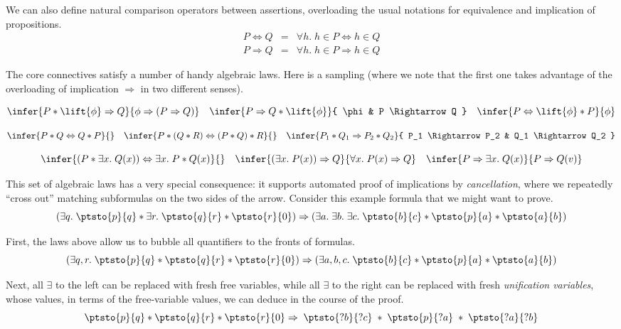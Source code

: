 \documentclass{amsbook}
\theoremstyle{definition}
\theoremstyle{remark}
\numberwithin{section}{chapter}
\numberwithin{equation}{chapter}
\begin{document}
We can also define natural comparison operators between assertions, overloading the usual notations for equivalence and implication of propositions.
\begin{eqnarray*}
  P \Leftrightarrow Q &=& \forall h. \; h \in P \Leftrightarrow h \in Q \\
  P \Rightarrow Q &=& \forall h. \; h \in P \Rightarrow h \in Q
\end{eqnarray*}

The core connectives satisfy a number of handy algebraic laws.
Here is a sampling (where we note that the first one takes advantage of the overloading of implication $\Rightarrow$ in two different senses).

$$\infer{P * \lift{\phi} \Rightarrow Q}{
  \phi \Rightarrow (P \Rightarrow Q)
}
\quad \infer{P \Rightarrow Q * \lift{\phi}}{
  \phi
  & P \Rightarrow Q
}
\quad \infer{P \Leftrightarrow \lift{\phi} * P}{
  \phi
}$$

$$\infer{P * Q \Leftrightarrow Q * P}{}
\quad \infer{P * (Q * R) \Leftrightarrow (P * Q) * R}{}
\quad \infer{P_1 * Q_1 \Rightarrow P_2 * Q_2}{
  P_1 \Rightarrow P_2
  & Q_1 \Rightarrow Q_2
}$$

$$\infer{(P * \exists x. \; Q(x)) \Leftrightarrow \exists x. \; P * Q(x)}{}
\quad \infer{(\exists x. \; P(x)) \Rightarrow Q}{
  \forall x. \; P(x) \Rightarrow Q
}
\quad \infer{P \Rightarrow \exists x. \; Q(x)}{
  P \Rightarrow Q(v)
}$$

This set of algebraic laws has a very special consequence: it supports automated proof of implications by \emph{cancellation}, where we repeatedly ``cross out'' matching subformulas on the two sides of the arrow.
Consider this example formula that we might want to prove.
$$(\exists q. \; \ptsto{p}{q} * \exists r. \; \ptsto{q}{r} * \ptsto{r}{0}) \Rightarrow (\exists a. \; \exists b. \; \exists c. \; \ptsto{b}{c} * \ptsto{p}{a} * \ptsto{a}{b})$$

First, the laws above allow us to bubble all quantifiers to the fronts of formulas.
$$(\exists q, r. \; \ptsto{p}{q} * \ptsto{q}{r} * \ptsto{r}{0}) \Rightarrow (\exists a, b, c. \; \ptsto{b}{c} * \ptsto{p}{a} * \ptsto{a}{b})$$

Next, all $\exists$ to the left can be replaced with fresh free variables, while all $\exists$ to the right can be replaced with fresh \emph{unification variables}, whose values, in terms of the free-variable values, we can deduce in the course of the proof.
$$\ptsto{p}{q} * \ptsto{q}{r} * \ptsto{r}{0} \Rightarrow \; \ptsto{?b}{?c} \; * \; \ptsto{p}{?a} \; * \; \ptsto{?a}{?b}$$
\end{document}
